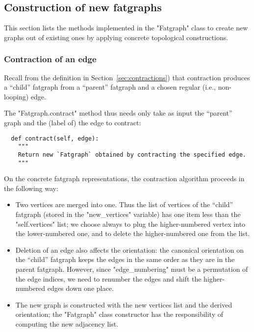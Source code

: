 \subsection{Construction of new fatgraphs}
\label{sec:construction}

This section lists the methods implemented in the "Fatgraph" class to
create new graphs out of existing ones by applying concrete
topological constructions.

\subsubsection{Contraction of an edge}
\label{sec:contract}

Recall from the definition in Section~\ref{sec:contractions}) that
contraction produces a ``child'' fatgraph from a ``parent'' fatgraph
and a chosen regular (i.e., non-looping) edge. 

The "Fatgraph.contract" method thus needs only take as input the ``parent''
graph and the (label of) the edge to contract:
\begin{lstlisting}
  def contract(self, edge):
    """
    Return new `Fatgraph` obtained by contracting the specified edge.
    """

\end{lstlisting}

On the concrete fatgraph representations, the contraction algorithm
proceeds in the following way:
\begin{itemize}
\item Two vertices are merged into one. Thus the list of vertices of
  the ``child'' fatgraph (stored in the "new_vertices" variable) has
  one item less than the "self.vertices" list; we choose always to
  plug the higher-numbered vertex into the lower-numbered one, and to
  delete the higher-numbered one from the list.
\item Deletion of an edge also affects the orientation: the canonical
  orientation on the ``child'' fatgraph keeps the edges in the same
  order as they are in the parent fatgraph.  However, since
  "edge_numbering" must be a permutation of the edge indices, we need
  to renumber the edges and shift the higher-numbered edges down one
  place.
\item The new graph is constructed with the new vertices list and the
  derived orientation; the "Fatgraph" class constructor has the
  responsibility of computing the new adjacency list. 
\end{itemize}

